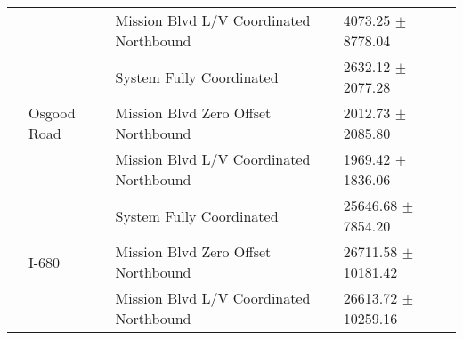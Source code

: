 \begin{tabular}{llll}
 &  & Mission Blvd L/V Coordinated Northbound & 4073.25 $\pm$ 8778.04 \\
 & \multirow[t]{3}{*}{Osgood Road} & System Fully Coordinated & 2632.12 $\pm$ 2077.28 \\
 &  & Mission Blvd Zero Offset Northbound & 2012.73 $\pm$ 2085.80 \\
 &  & Mission Blvd L/V Coordinated Northbound & 1969.42 $\pm$ 1836.06 \\
 & \multirow[t]{3}{*}{I-680} & System Fully Coordinated & 25646.68 $\pm$ 7854.20 \\
 &  & Mission Blvd Zero Offset Northbound & 26711.58 $\pm$ 10181.42 \\
 &  & Mission Blvd L/V Coordinated Northbound & 26613.72 $\pm$ 10259.16 \\
\bottomrule
\end{tabular}
